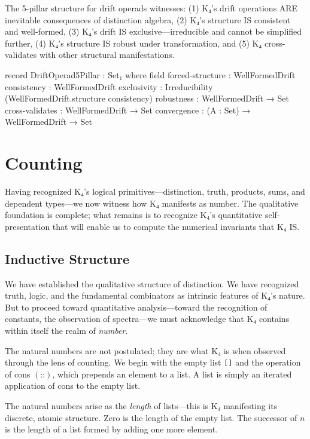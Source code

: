\documentclass[11pt,a4paper]{book}
\begin{document}
The 5-pillar structure for drift operads witnesses: (1) K₄'s drift operations ARE inevitable consequences of distinction algebra, (2) K₄'s structure IS consistent and well-formed, (3) K₄'s drift IS exclusive—irreducible and cannot be simplified further, (4) K₄'s structure IS robust under transformation, and (5) K₄ cross-validates with other structural manifestations.

\begin{code}
record DriftOperad5Pillar : Set₁ where
  field
    forced-structure : WellFormedDrift
    consistency      : WellFormedDrift
    exclusivity      : Irreducibility (WellFormedDrift.structure consistency)
    robustness       : WellFormedDrift → Set
    cross-validates  : WellFormedDrift → Set
    convergence      : (A : Set) → WellFormedDrift → Set

\end{code}

\part{Counting}

Having recognized K₄'s logical primitives—distinction, truth, products, sums, and dependent types—we now witness how K₄ manifests as number. The qualitative foundation is complete; what remains is to recognize K₄'s quantitative self-presentation that will enable us to compute the numerical invariants that K₄ IS.

\chapter{Inductive Structure}

We have established the qualitative structure of distinction. We have recognized truth,
logic, and the fundamental combinators as intrinsic features of K₄'s nature. But to proceed toward quantitative analysis—toward
the recognition of constants, the observation of spectra—we must acknowledge that K₄ contains within itself the realm of \emph{number}.

The natural numbers are not postulated; they are what K₄ is when observed through the lens of counting. We begin with the empty
list \texttt{[]} and the operation of cons $(\texttt{::})$, which prepends an element
to a list. A list is simply an iterated application of cons to the empty list.

The natural numbers arise as the \emph{length} of lists—this is K₄ manifesting its discrete, atomic structure. Zero is the length of the
empty list. The successor of $n$ is the length of a list formed by adding one more
element.
\end{document}
